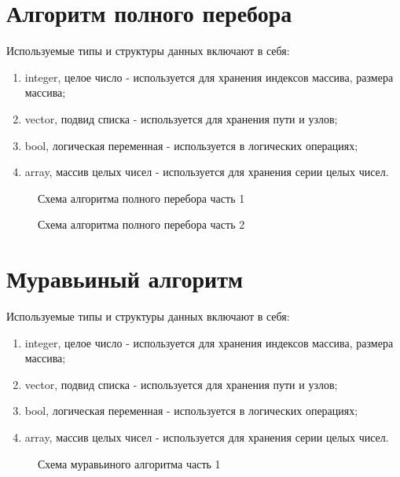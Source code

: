 \section{Алгоритм полного перебора}

Используемые типы и структуры данных включают в себя:
\begin{enumerate}
	\item integer, целое число - используется для хранения индексов массива, размера массива;
	\item vector, подвид списка - используется для хранения пути и узлов;
	\item bool, логическая переменная - используется в логических операциях;
	\item array, массив целых чисел - используется для хранения серии целых чисел.
\end{enumerate}

\newpage

\begin{figure}[ph!]
	\caption{Схема алгоритма полного перебора часть 1}
\end{figure}

\newpage

\begin{figure}[ph!]
	\caption{Схема алгоритма полного перебора часть 2}
\end{figure}


\section{Муравьиный алгоритм}

Используемые типы и структуры данных включают в себя:
\begin{enumerate}
	\item integer, целое число - используется для хранения индексов массива, размера массива;
	\item vector, подвид списка - используется для хранения пути и узлов;
	\item bool, логическая переменная - используется в логических операциях;
	\item array, массив целых чисел - используется для хранения серии целых чисел.
\end{enumerate}

\begin{figure}[ph!]
	\caption{Схема муравьиного алгоритма часть 1}
\end{figure}

